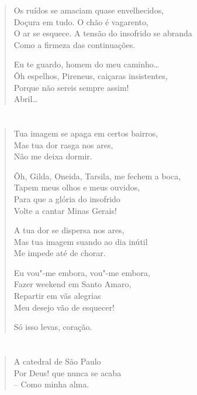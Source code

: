 {\begin{verse}
Os ruídos se amaciam quase envelhecidos,\\
Doçura em tudo. O chão é vagarento,\\
O ar se esquece. A tensão do insofrido se abranda\\
Como a firmeza das continuações.

Eu te guardo, homem do meu caminho\ldots{}\\
Ôh espelhos, Pireneus, caiçaras insistentes,\\
Porque não sereis sempre assim!\\
Abril\ldots{}
\end{verse}

\chapter*{}

\begin{verse}
Tua imagem se apaga em certos bairros,\\
Mas tua dor rasga nos ares,\\
Não me deixa dormir.

Ôh, Gilda, Oneida, Tarsila, me fechem a boca,\\
Tapem meus olhos e meus ouvidos,\\
Para que a glória do insofrido\\
Volte a cantar Minas Gerais!

A tua dor se dispersa nos ares,\\
Mas tua imagem suando ao dia inútil\\
Me impede até de chorar.

Eu vou"-me embora, vou"-me embora,\\
Fazer weekend em Santo Amaro,\\
Repartir em vãs alegrias\\
Meu desejo vão de esquecer!

Só isso levas, coração.
\end{verse}

\chapter*{}

\begin{verse}
A catedral de São Paulo\\
Por Deus! que nunca se acaba\\
-- Como minha alma.


\end{verse}}
